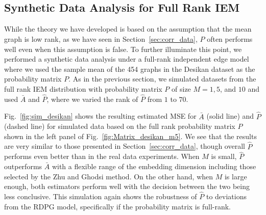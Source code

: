 \documentclass[10pt,letterpaper]{article}
\renewcommand{\hat}{\widehat}
\begin{document}
%
%









\subsection{Synthetic Data Analysis for Full Rank IEM}\label{sec:sim_iem}

While the theory we have developed is based on the assumption that the mean graph is low rank, as we have seen in Section~\ref{sec:corr_data}, $\hat{P}$ often performs well even when this assumption is false. 
To further illuminate this point, we performed a synthetic data analysis under a full-rank independent edge model where we used the sample mean of the 454 graphs in the Desikan dataset as the probability matrix $P$.
As in the previous section, we simulated datasets from the full rank IEM distribution with probability matrix $P$ of size $M=1,5$, and $10$ and used $\bar{A}$ and $\hat{P}$, where we varied the rank of $\hat{P}$ from $1$ to $70$.

Fig.~\ref{fig:sim_desikan} shows the resulting estimated MSE for $\bar{A}$ (solid line) and $\hat{P}$ (dashed line) for simulated data based on the full rank probability matrix $P$ shown in the left panel of Fig.~\ref{fig:Matrix_desikan_m5}.
We see that the results are very similar to those presented in Section~\ref{sec:corr_data}, though overall $\hat{P}$ performs even better than in the real data experiments. 
When $M$ is small, $\hat{P}$ outperforms $\bar{A}$ with a flexible range of the embedding dimension including those selected by the Zhu and Ghodsi method.
On the other hand, when $M$ is large enough, both estimators perform well with the decision between the two being less conclusive.
This simulation again shows the robustness of $\hat{P}$ to deviations from the RDPG model, specifically if the probability matrix is full-rank.
\end{document}
